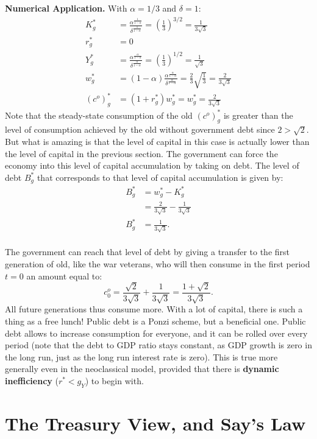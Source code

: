 \documentclass[]{book}
\begin{document}
\textbf{Numerical Application.} With \(\alpha = 1/3\) and
\(\delta = 1\): \[
\begin{aligned}
K^{*}_g&=\frac{\alpha^{\frac{1}{1-\alpha}}}{\delta^{\frac{1}{1-\alpha}}}=\left(\frac{1}{3}\right)^{3/2} = \frac{1}{3\sqrt{3}}\\
r_g^{*}&=0\\
Y_g^{*}&=\frac{\alpha^{\frac{\alpha}{1-\alpha}}}{\delta^{\frac{\alpha}{1-\alpha}}} = \left(\frac{1}{3}\right)^{1/2}=\frac{1}{\sqrt{3}}\\
w^{*}_g&=(1-\alpha) \frac{\alpha^{\frac{\alpha}{1-\alpha}}}{\delta^{\frac{\alpha}{1-\alpha}}}= \frac{2}{3}\sqrt{\frac{1}{3}} = \frac{2}{3\sqrt{3}}\\
(c^{o})^{*}_g&=(1+r^*_g)w^{*}_g=w^{*}_g = \frac{2}{3\sqrt{3}}
\end{aligned}
\] Note that the steady-state consumption of the old \((c^{o})^{*}_g\)
is greater than the level of consumption achieved by the old without
government debt since \(2>\sqrt{2}\). But what is amazing is that the
level of capital in this case is actually lower than the level of
capital in the previous section. The government can force the economy
into this level of capital accumulation by taking on debt. The level of
debt \(B^{*}_g\) that corresponds to that level of capital accumulation
is given by: \[
\begin{aligned}
B^{*}_g&=w^{*}_g-K^{*}_g\\
&=\frac{2}{3\sqrt{3}}-\frac{1}{3\sqrt{3}}\\
B^{*}_g&=\frac{1}{3\sqrt{3}}.
\end{aligned}
\]\\
The government can reach that level of debt by giving a transfer to the
first generation of old, like the war veterans, who will then consume in
the first period \(t=0\) an amount equal to:
\[c_{0}^{o}=\frac{\sqrt{2}}{3\sqrt{3}}+\frac{1}{3\sqrt{3}}=\frac{1+\sqrt{2}}{3\sqrt{3}}.\]
All future generations thus consume more. With a lot of capital, there
is such a thing as a free lunch! Public debt is a Ponzi scheme, but a
beneficial one. Public debt allows to increase consumption for everyone,
and it can be rolled over every period (note that the debt to GDP ratio
stays constant, as GDP growth is zero in the long run, just as the long
run interest rate is zero). This is true more generally even in the
neoclassical model, provided that there is \textbf{dynamic inefficiency}
(\(r^*<g_Y\)) to begin with.

\section{The Treasury View, and Say's
Law}\label{the-treasury-view-and-says-law}
\end{document}
